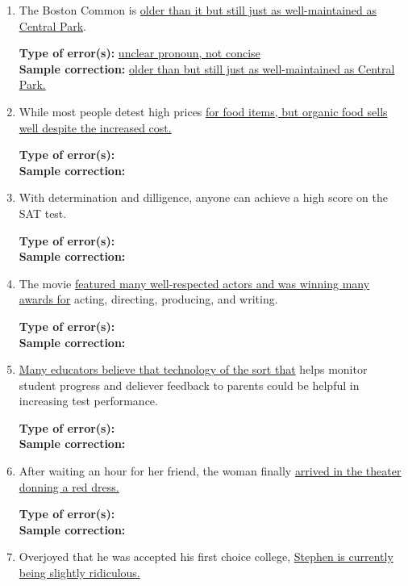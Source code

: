 \begin{enumerate}
\item The Boston Common is \ul{ older than it but still just as well-maintained as Central Park}.

\bigskip
\textbf{Type of error(s):} \ul{unclear pronoun, not concise} \\
\textbf{Sample correction:} \ul{older than but still just as well-maintained as Central Park.}

\bigskip
\item While most people detest high prices \ul{for food items, but organic food sells well despite the increased cost.}

\bigskip
\textbf{Type of error(s):} \hrulefill  \\
\textbf{Sample correction:} \hrulefill

\item With determination and dilligence, anyone can achieve a high score on the SAT test. 

\bigskip
\textbf{Type of error(s):} \hrulefill  \\
\textbf{Sample correction:} \hrulefill

\bigskip
\item The movie \ul{featured many well-respected actors and was winning many awards for} acting, directing, producing, and writing. 

\bigskip
\textbf{Type of error(s):} \hrulefill  \\
\textbf{Sample correction:} \hrulefill

\bigskip
\item \ul{Many educators believe that technology of the sort that} helps monitor student progress and deliever feedback to parents could be helpful in increasing test performance. 

\bigskip
\textbf{Type of error(s):} \hrulefill  \\
\textbf{Sample correction:} \hrulefill

\item After waiting an hour for her friend, the woman finally \ul{arrived in the theater donning a red dress.}

\bigskip
\textbf{Type of error(s):} \hrulefill  \\
\textbf{Sample correction:} \hrulefill

\item Overjoyed that he was accepted his first choice college, \ul{Stephen is currently being slightly ridiculous.}


\end{enumerate}
